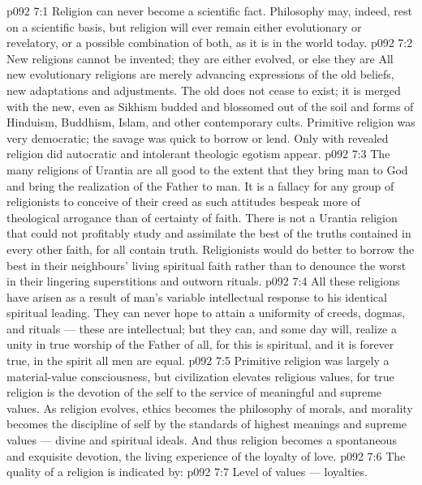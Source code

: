 \vs p092 7:1 Religion can never become a scientific fact. Philosophy may, indeed, rest on a scientific basis, but religion will ever remain either evolutionary or revelatory, or a possible combination of both, as it is in the world today.
\vs p092 7:2 New religions cannot be invented; they are either evolved, or else they are  All new evolutionary religions are merely advancing expressions of the old beliefs, new adaptations and adjustments. The old does not cease to exist; it is merged with the new, even as Sikhism budded and blossomed out of the soil and forms of Hinduism, Buddhism, Islam, and other contemporary cults. Primitive religion was very democratic; the savage was quick to borrow or lend. Only with revealed religion did autocratic and intolerant theologic egotism appear.
\vs p092 7:3 The many religions of Urantia are all good to the extent that they bring man to God and bring the realization of the Father to man. It is a fallacy for any group of religionists to conceive of their creed as  such attitudes bespeak more of theological arrogance than of certainty of faith. There is not a Urantia religion that could not profitably study and assimilate the best of the truths contained in every other faith, for all contain truth. Religionists would do better to borrow the best in their neighbours’ living spiritual faith rather than to denounce the worst in their lingering superstitions and outworn rituals.
\vs p092 7:4 All these religions have arisen as a result of man’s variable intellectual response to his identical spiritual leading. They can never hope to attain a uniformity of creeds, dogmas, and rituals --- these are intellectual; but they can, and some day will, realize a unity in true worship of the Father of all, for this is spiritual, and it is forever true, in the spirit all men are equal.
\vs p092 7:5 \pc Primitive religion was largely a material\hyp{}value consciousness, but civilization elevates religious values, for true religion is the devotion of the self to the service of meaningful and supreme values. As religion evolves, ethics becomes the philosophy of morals, and morality becomes the discipline of self by the standards of highest meanings and supreme values --- divine and spiritual ideals. And thus religion becomes a spontaneous and exquisite devotion, the living experience of the loyalty of love.
\vs p092 7:6 The quality of a religion is indicated by:
\vs p092 7:7 \bibnobreakspace Level of values --- loyalties.
